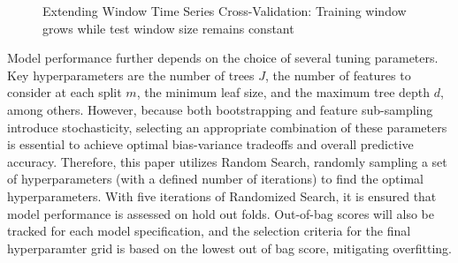 \begin{figure}[H]
    \caption{Extending Window Time Series Cross-Validation: Training window grows while test window size remains constant}
    \end{figure}

Model performance further depends on the choice of several tuning parameters.  Key hyperparameters are the number of trees $J$, the number of features to consider at each split $m$, the minimum leaf size, and the maximum tree depth $d$, among others.  However, because both bootstrapping and feature sub-sampling introduce stochasticity, selecting an appropriate combination of these parameters is essential to achieve optimal bias-variance tradeoffs and overall predictive accuracy. Therefore, this paper utilizes Random Search, randomly sampling a set of hyperparameters (with a defined number of iterations) to find the optimal hyperparameters. With five iterations of Randomized Search, it is ensured that model performance is assessed on hold out folds. Out-of-bag scores will also be tracked for each model specification, and the selection criteria for the final hyperparamter grid is based on the lowest out of bag score, mitigating overfitting.

